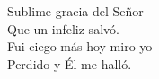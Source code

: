 Sublime gracia del Señor \\
Que un infeliz salvó. \\
Fui ciego más hoy miro yo \\
Perdido y Él me halló. \\
